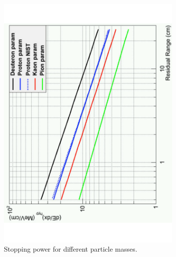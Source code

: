 \begin{figure}[h!]
  \centering
  \begin{subfigure}{0.45\textwidth}
    \centering
    \includegraphics[width=\textwidth]{StoppingPower}
    \caption{Stopping power for different particle masses.}
    \label{fig:PIDA_loglog}
  \end{subfigure}
  \hspace{0.08\textwidth}
  \begin{subfigure}{0.45\textwidth}
    \centering

\end{subfigure}
\end{figure}
